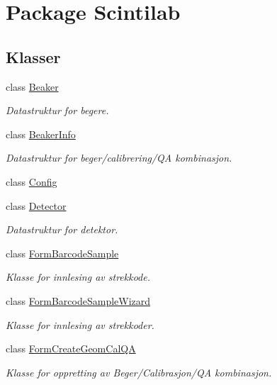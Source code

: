 \hypertarget{namespace_scintilab}{\section{Package Scintilab}
\label{namespace_scintilab}
}
\subsection*{Klasser}
\begin{DoxyCompactItemize}
\item 
class \hyperlink{class_scintilab_1_1_beaker}{Beaker}
\begin{DoxyCompactList}\small\item\em Datastruktur for begere. \end{DoxyCompactList}\item 
class \hyperlink{class_scintilab_1_1_beaker_info}{Beaker\+Info}
\begin{DoxyCompactList}\small\item\em Datastruktur for beger/calibrering/\+Q\+A kombinasjon. \end{DoxyCompactList}\item 
class \hyperlink{class_scintilab_1_1_config}{Config}
\item 
class \hyperlink{class_scintilab_1_1_detector}{Detector}
\begin{DoxyCompactList}\small\item\em Datastruktur for detektor. \end{DoxyCompactList}\item 
class \hyperlink{class_scintilab_1_1_form_barcode_sample}{Form\+Barcode\+Sample}
\begin{DoxyCompactList}\small\item\em Klasse for innlesing av strekkode. \end{DoxyCompactList}\item 
class \hyperlink{class_scintilab_1_1_form_barcode_sample_wizard}{Form\+Barcode\+Sample\+Wizard}
\begin{DoxyCompactList}\small\item\em Klasse for innlesing av strekkoder. \end{DoxyCompactList}\item 
class \hyperlink{class_scintilab_1_1_form_create_geom_cal_q_a}{Form\+Create\+Geom\+Cal\+Q\+A}
\begin{DoxyCompactList}\small\item\em Klasse for oppretting av Beger/\+Calibrasjon/\+Q\+A kombinasjon. \end{DoxyCompactList}\item 

\end{DoxyCompactItemize}
